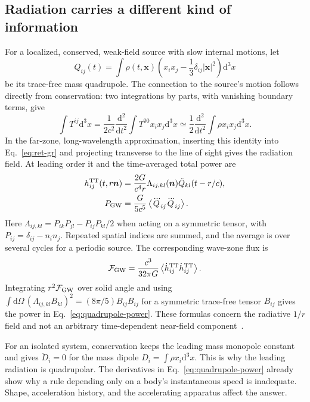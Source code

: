 \documentclass[11pt,a4paper]{article}
\numberwithin{equation}{section}
\newcommand{\dd}{\mathrm{d}}
\newcommand{\TT}{\mathrm{TT}}
\newcommand{\avg}[1]{\left\langle #1\right\rangle}
\begin{document}
\subsection{Radiation carries a different kind of information}

For a localized, conserved, weak-field source with slow internal motions, let
\begin{equation}
 Q_{ij}(t)=\int\rho(t,\bm x)
 \left(x_i x_j-\frac13\delta_{ij}|\bm x|^2\right)\dd^3x
 \label{eq:quadrupole}
\end{equation}
be its trace-free mass quadrupole. The connection to the source's motion follows directly from conservation: two integrations by parts, with vanishing boundary terms, give
\begin{equation}
 \int T^{ij}\dd^3x
 =\frac{1}{2c^2}\frac{\dd^2}{\dd t^2}
 \int T^{00}x_i x_j\dd^3x
 \simeq\frac12\frac{\dd^2}{\dd t^2}\int\rho x_i x_j\dd^3x.
\end{equation}
In the far-zone, long-wavelength approximation, inserting this identity into Eq.~\eqref{eq:ret-gr} and projecting transverse to the line of sight gives the radiation field. At leading order it and the time-averaged total power are
\begin{align}
 h_{ij}^{\TT}(t,r\bm n)&=\frac{2G}{c^4r}
 \Lambda_{ij,kl}(\bm n)\ddot Q_{kl}(t-r/c),\\
 P_{\rm GW}&=\frac{G}{5c^5}\avg{\dddot Q_{ij}\dddot Q_{ij}}.
 \label{eq:quadrupole-power}
\end{align}
Here $\Lambda_{ij,kl}=P_{ik}P_{jl}-P_{ij}P_{kl}/2$ when acting on a symmetric tensor, with $P_{ij}=\delta_{ij}-n_i n_j$. Repeated spatial indices are summed, and the average is over several cycles for a periodic source. The corresponding wave-zone flux is
\begin{equation}
 \mathcal F_{\rm GW}=\frac{c^3}{32\pi G}
 \avg{\dot h_{ij}^{\TT}\dot h_{ij}^{\TT}}.
 \label{eq:flux}
\end{equation}
Integrating $r^2\mathcal F_{\rm GW}$ over solid angle and using
$\int\!\dd\Omega\,(\Lambda_{ij,kl}B_{kl})^2=(8\pi/5)B_{ij}B_{ij}$ for a symmetric trace-free tensor $B_{ij}$ gives the power in Eq.~\eqref{eq:quadrupole-power}. These formulas concern the radiative $1/r$ field and not an arbitrary time-dependent near-field component~\cite{flanagan}.

For an isolated system, conservation keeps the leading mass monopole constant and gives $\ddot D_i=0$ for the mass dipole $D_i=\int\rho x_i\dd^3x$. This is why the leading radiation is quadrupolar. The derivatives in Eq.~\eqref{eq:quadrupole-power} already show why a rule depending only on a body's instantaneous speed is inadequate. Shape, acceleration history, and the accelerating apparatus affect the answer.
\end{document}

